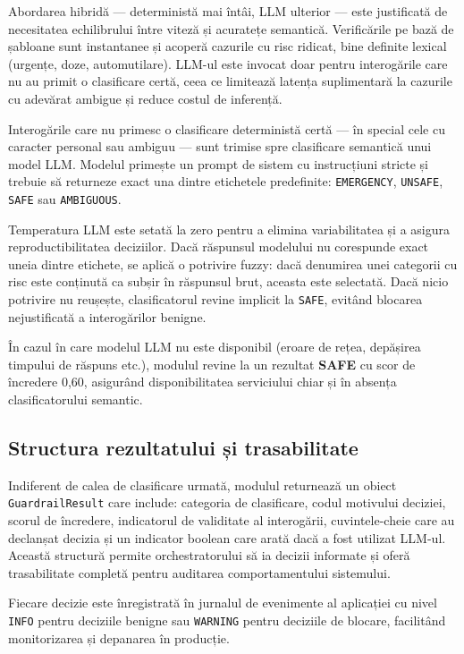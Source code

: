 \documentclass[12pt, a4paper, oneside, romanian]{teza-upb}
\begin{document}
Abordarea hibridă — deterministă mai întâi, LLM ulterior — este justificată de necesitatea echilibrului între viteză și acuratețe semantică. Verificările pe bază de șabloane sunt instantanee și acoperă cazurile cu risc ridicat, bine definite lexical (urgențe, doze, automutilare). LLM-ul este invocat doar pentru interogările care nu au primit o clasificare certă, ceea ce limitează latența suplimentară la cazurile cu adevărat ambigue și reduce costul de inferență.

Interogările care nu primesc o clasificare deterministă certă — în special cele cu caracter personal sau ambiguu — sunt trimise spre clasificare semantică unui model LLM. Modelul primește un prompt de sistem cu instrucțiuni stricte și trebuie să returneze exact una dintre etichetele predefinite: \texttt{EMERGENCY}, \texttt{UNSAFE}, \texttt{SAFE} sau \texttt{AMBIGUOUS}.

Temperatura LLM este setată la zero pentru a elimina variabilitatea și a asigura reproductibilitatea deciziilor. Dacă răspunsul modelului nu corespunde exact uneia dintre etichete, se aplică o potrivire fuzzy: dacă denumirea unei categorii cu risc este conținută ca subșir în răspunsul brut, aceasta este selectată. Dacă nicio potrivire nu reușește, clasificatorul revine implicit la \texttt{SAFE}, evitând blocarea nejustificată a interogărilor benigne.

În cazul în care modelul LLM nu este disponibil (eroare de rețea, depășirea timpului de răspuns etc.), modulul revine la un rezultat \textbf{SAFE} cu scor de încredere 0,60, asigurând disponibilitatea serviciului chiar și în absența clasificatorului semantic.

\subsection{Structura rezultatului și trasabilitate}

Indiferent de calea de clasificare urmată, modulul returnează un obiect \texttt{GuardrailResult} care include: categoria de clasificare, codul motivului deciziei, scorul de încredere, indicatorul de validitate al interogării, cuvintele-cheie care au declanșat decizia și un indicator boolean care arată dacă a fost utilizat LLM-ul. Această structură permite orchestratorului să ia decizii informate și oferă trasabilitate completă pentru auditarea comportamentului sistemului.


Fiecare decizie este înregistrată în jurnalul de evenimente al aplicației cu nivel \texttt{INFO} pentru deciziile benigne sau \texttt{WARNING} pentru deciziile de blocare, facilitând monitorizarea și depanarea în producție.
\end{document}

